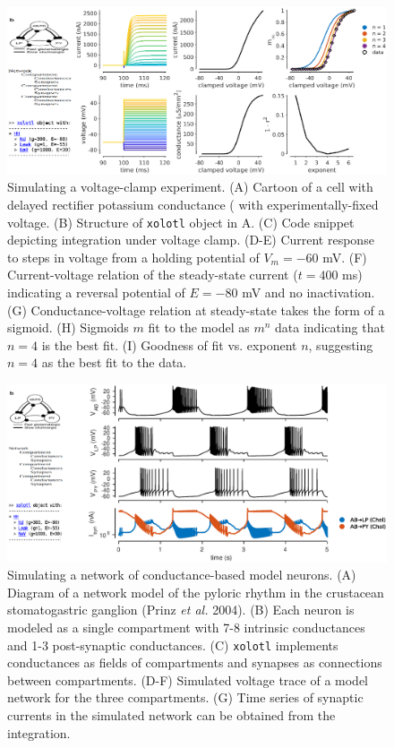 \documentclass{frontiersSCNS} %
\begin{document}
\begin{figure}
	\centering
	\includegraphics[width=1.0\linewidth]{gfx/figure_clamp}
	\caption{Simulating a voltage-clamp experiment. (A) Cartoon of a cell with delayed rectifier potassium conductance (\cite{liuModelNeuronActivitydependent1998} with experimentally-fixed voltage. (B) Structure of \texttt{xolotl} object in A. (C) Code snippet depicting integration under voltage clamp. (D-E) Current response to steps in voltage from a holding potential of $V_m = -60$ mV. (F) Current-voltage relation of the steady-state current ($t = 400$ ms) indicating a reversal potential of $E = -80$ mV and no inactivation. (G) Conductance-voltage relation at steady-state takes the form of a sigmoid. (H) Sigmoids $m$ fit to the model as $m^n$ data indicating that $n=4$ is the best fit. (I) Goodness of fit vs. exponent $n$, suggesting $n=4$ as the best fit to the data.}
	\label{fig:figureclamp}
\end{figure}

\begin{figure}
	\centering
	\includegraphics[width=1.0\linewidth]{gfx/figure_network}
	\caption{Simulating a network of conductance-based model neurons. (A) Diagram of a network model of the pyloric rhythm in the crustacean stomatogastric ganglion (Prinz \textit{et al.} 2004). (B) Each neuron is modeled as a single compartment with 7-8 intrinsic conductances and 1-3 post-synaptic conductances. (C) \texttt{xolotl} implements conductances as fields of compartments and synapses as connections between compartments. (D-F) Simulated voltage trace of a model network for the three compartments. (G) Time series of synaptic currents in the simulated network can be obtained from the integration.}
	\label{fig:figurenetwork}
\end{figure}
\end{document}
